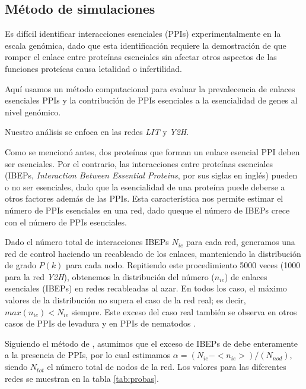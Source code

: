 
\subsection{M\'etodo de simulaciones}
\label{sec:simulacion}

Es dif\'icil identificar interacciones esenciales (PPIs) experimentalmente en la escala gen\'omica, dado que esta identificaci\'on requiere la demostraci\'on de que romper el enlace entre prote\'inas esenciales sin afectar otros aspectos de las funciones prote\'icas causa letalidad o infertilidad.

Aqu\'i usamos un m\'etodo computacional para evaluar la prevalecencia de enlaces esenciales PPIs y la contribuci\'on de PPIs esenciales a la esencialidad de genes al nivel gen\'omico.

Nuestro an\'alisis se enfoca en las redes {\it LIT} y {\it Y2H}.

Como se mencion\'o antes, dos prote\'inas que forman un enlace esencial PPI deben ser esenciales.
Por el contrario, las interacciones entre prote\'inas esenciales (IBEPs, {\it Interaction Between Essential Proteins}, por sus siglas en ingl\'es) pueden o no ser esenciales, dado que la esencialidad de una prote\'ina puede deberse a otros factores adem\'as de las PPIs.
Esta caracter\'istica nos permite estimar el n\'umero de PPIs esenciales en una red, dado queque el n\'umero de IBEPs crece con el n\'umero de PPIs esenciales.

Dado el n\'umero total de interacciones IBEPs $N_{ie}$ para cada red, generamos una red de control haciendo un recableado de los enlaces, manteniendo la distribuci\'on de grado $P(k)$ para cada nodo.
Repitiendo este procedimiento 5000 veces (1000 para la red {\it Y2H}), obtenemos la distribuci\'on del n\'umero ($n_{ie}$) de enlaces esenciales (IBEPs) en redes recableadas al azar.
En todos los caso, el m\'aximo valores de la distribuci\'on no supera el caso de la red real; es decir, $max(n_{ie}) < N_{ie}$ siempre.
Este exceso del caso real tambi\'en se observa en otros casos de PPIs de levadura y en PPIs de nematodos \cite{pereira05}.

Siguiendo el m\'etodo de \cite{he2006}, asumimos que el exceso de IBEPs de debe enteramente a la presencia de PPIs, por lo cual estimamos $\alpha = (N_{ie} - <n_{ie}>)/(N_{nod})$, siendo $N_{tot}$ el n\'umero total de nodos de la red.
Los valores para las diferentes redes se muestran en la tabla \ref{tab:probas}.

